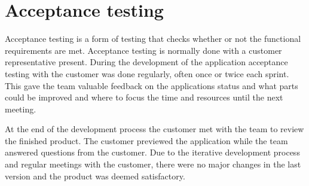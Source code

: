 \section{Acceptance testing}
Acceptance testing is a form of testing that checks whether or not the functional requirements are met. Acceptance testing is normally done with a customer representative present. During the development of the application acceptance testing with the customer was done regularly, often once or twice each sprint. This gave the team valuable feedback on the applications status and what parts could be improved and where to focus the time and resources until the next meeting.

At the end of the development process the customer met with the team to review the finished product. The customer previewed the application while the team answered questions from the customer. Due to the iterative development process and regular meetings with the customer, there were no major changes in the last version and the product was deemed satisfactory.